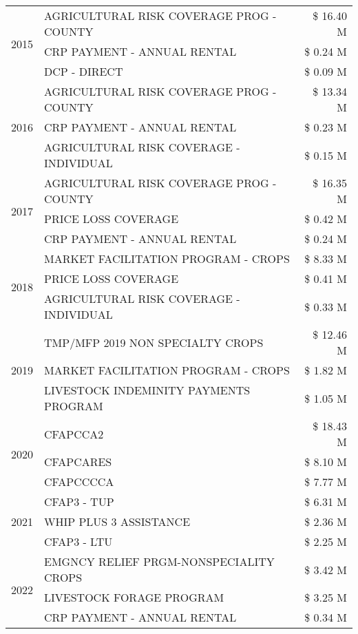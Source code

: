 \begin{tabular}{llr}
\cline{1-3}
\multirow[t]{3}{*}{2015} & AGRICULTURAL RISK COVERAGE PROG - COUNTY & \$ 16.40 M \\
 & CRP PAYMENT - ANNUAL RENTAL & \$ 0.24 M \\
 & DCP - DIRECT & \$ 0.09 M \\
\cline{1-3}
\multirow[t]{3}{*}{2016} & AGRICULTURAL RISK COVERAGE PROG - COUNTY & \$ 13.34 M \\
 & CRP PAYMENT - ANNUAL RENTAL & \$ 0.23 M \\
 & AGRICULTURAL RISK COVERAGE - INDIVIDUAL & \$ 0.15 M \\
\cline{1-3}
\multirow[t]{3}{*}{2017} & AGRICULTURAL RISK COVERAGE PROG - COUNTY & \$ 16.35 M \\
 & PRICE LOSS COVERAGE & \$ 0.42 M \\
 & CRP PAYMENT - ANNUAL RENTAL & \$ 0.24 M \\
\cline{1-3}
\multirow[t]{3}{*}{2018} & MARKET FACILITATION PROGRAM - CROPS & \$ 8.33 M \\
 & PRICE LOSS COVERAGE & \$ 0.41 M \\
 & AGRICULTURAL RISK COVERAGE - INDIVIDUAL & \$ 0.33 M \\
\cline{1-3}
\multirow[t]{3}{*}{2019} & TMP/MFP 2019 NON SPECIALTY CROPS & \$ 12.46 M \\
 & MARKET FACILITATION PROGRAM - CROPS & \$ 1.82 M \\
 & LIVESTOCK INDEMINITY PAYMENTS PROGRAM & \$ 1.05 M \\
\cline{1-3}
\multirow[t]{3}{*}{2020} & CFAPCCA2 & \$ 18.43 M \\
 & CFAPCARES & \$ 8.10 M \\
 & CFAPCCCCA & \$ 7.77 M \\
\cline{1-3}
\multirow[t]{3}{*}{2021} & CFAP3 - TUP & \$ 6.31 M \\
 & WHIP PLUS 3 ASSISTANCE & \$ 2.36 M \\
 & CFAP3 - LTU & \$ 2.25 M \\
\cline{1-3}
\multirow[t]{3}{*}{2022} & EMGNCY RELIEF PRGM-NONSPECIALITY CROPS & \$ 3.42 M \\
 & LIVESTOCK FORAGE PROGRAM & \$ 3.25 M \\
 & CRP PAYMENT - ANNUAL RENTAL & \$ 0.34 M \\
\cline{1-3}
\bottomrule
\end{tabular}
